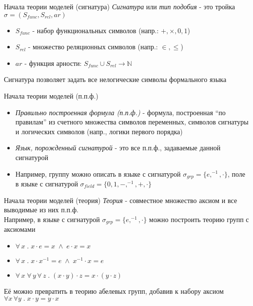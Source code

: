 \documentclass{beamer}
\begin{document}
\begin{frame}{Начала теории моделей (сигнатура)}
  \textit{Сигнатура} или \textit{тип подобия} - это тройка $\sigma = (S_{func}, S_{rel}, ar)$\\
  \bigskip
  \begin{itemize}
    \item $S_{func}$ - набор функциональных символов (напр.: $+, \times, 0, 1$)
    \item $S_{rel}$ - множество реляционных символов (напр.: $\in, \leq$)
    \item $ar$ - функция арности: $S_{func} \cup S_{rel} \to \mathbb{N}$
  \end{itemize}
  \bigskip
  Сигнатура позволяет задать все нелогические символы формального языка
\end{frame}

\begin{frame}{Начала теории моделей (п.п.ф.)}
  \begin{itemize}
    \item \textit{Правильно построенная формула (п.п.ф.)} - формула, построенная ``по правилам'' из счетного множества символов переменных, символов сигнатуры и логических символов (напр., логики первого порядка)
    \item \textit{Язык, порожденный сигнатурой} - это все п.п.ф., задаваемые данной сигнатурой
    \item Например, группу можно описать в языке с сигнатурой $\sigma_{grp} = \{e, ^{-1}, \cdot\}$, поле в языке с сигнатурой $\sigma_{field} = \{0, 1, -, ^{-1}, +, \cdot\}$
  \end{itemize}
\end{frame}

\begin{frame}{Начала теории моделей (теория)}
\textit{Теория} - совместное множество аксиом и все выводимые из них п.п.ф.\\
\bigskip
Например, в языке с сигнатурой $\sigma_{grp} = \{e, ^{-1}, \cdot\}$ можно построить теорию групп с аксиомами\\
  \begin{itemize}
    \item $\forall \, x \; . \; x \cdot e = x \; \wedge \; e \cdot x = x$ 
    \item $\forall \, x \; . \;x \cdot x^{-1} = e \; \wedge \; x^{-1} \cdot x = e$ 
    \item $\forall \, x \; \forall \, y \, \forall \, z \; . \; (x \cdot y) \cdot z = x \cdot (y \cdot z)$
  \end{itemize}
Её можно превратить в теорию абелевых групп, добавив к набору аксиом $\forall x \, \forall y \; . \; x \cdot y = y \cdot x$
\end{frame}
\end{document}
